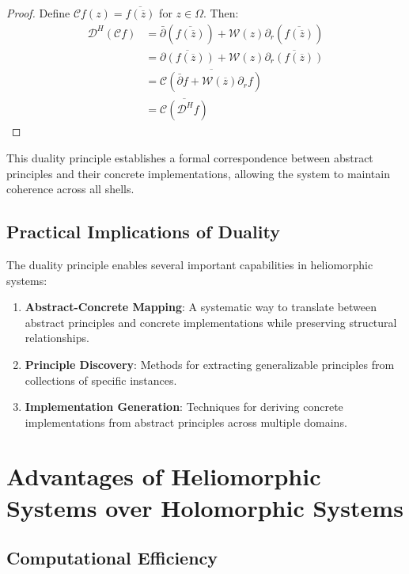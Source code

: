\begin{definition}
\begin{theorem}
\begin{theorem}
\begin{proof}
Define $\mathcal{C} f(z) = \overline{f(\overline{z})}$ for $z \in \Omega$. Then:
\begin{align}
\mathcal{D}^H(\mathcal{C} f) &= \bar{\partial}(\overline{f(\overline{z})}) + \mathcal{W}(z) \partial_r(\overline{f(\overline{z})})\\
&= \overline{\partial(f(\overline{z}))} + \mathcal{W}(z) \overline{\partial_r(f(\overline{z}))}\\
&= \overline{\mathcal{C}(\bar{\partial} f + \mathcal{W}(\overline{z}) \partial_r f)}\\
&= \overline{\mathcal{C}(\mathcal{D}^H f)}
\end{align}
\end{proof}

This duality principle establishes a formal correspondence between abstract principles and their concrete implementations, allowing the system to maintain coherence across all shells.

\subsection{Practical Implications of Duality}

The duality principle enables several important capabilities in heliomorphic systems:

\begin{enumerate}
    \item \textbf{Abstract-Concrete Mapping}: A systematic way to translate between abstract principles and concrete implementations while preserving structural relationships.
    
    \item \textbf{Principle Discovery}: Methods for extracting generalizable principles from collections of specific instances.
    
    \item \textbf{Implementation Generation}: Techniques for deriving concrete implementations from abstract principles across multiple domains.
\end{enumerate}

\section{Advantages of Heliomorphic Systems over Holomorphic Systems}

\subsection{Computational Efficiency}


\end{theorem}
\end{theorem}
\end{definition}
